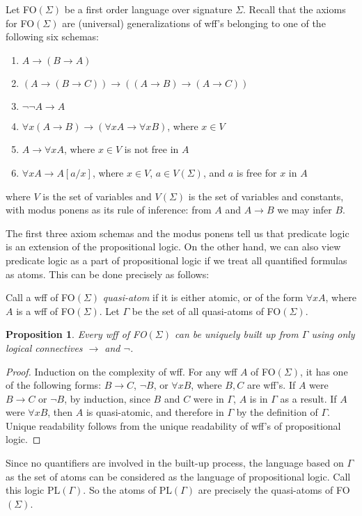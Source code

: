 \documentclass[12pt]{article}
\newtheorem{prop}{Proposition}
\begin{document}
Let FO$(\Sigma)$ be a first order language over signature $\Sigma$.  Recall that the axioms for FO$(\Sigma)$ are (universal) generalizations of wff's belonging to one of the following six schemas:
\begin{enumerate}
\item $A\to (B\to A)$
\item $(A\to (B\to C)) \to ((A\to B)\to (A\to C))$
\item $\neg \neg A \to A$
\item $\forall x (A\to B) \to (\forall x A \to \forall x B)$, where $x\in V$
\item $A\to \forall x A$, where $x\in V$ is not free in $A$
\item $\forall x A \to A[a/x]$, where $x\in V$, $a\in V(\Sigma)$, and $a$ is free for $x$ in $A$
\end{enumerate}
where $V$ is the set of variables and $V(\Sigma)$ is the set of variables and constants, with modus ponens as its rule of inference: from $A$ and $A\to B$ we may infer $B$.

The first three axiom schemas and the modus ponens tell us that predicate logic is an extension of the propositional logic.  On the other hand, we can also view predicate logic as a part of propositional logic if we treat all quantified formulas as atoms.  This can be done precisely as follows: 

Call a wff of FO$(\Sigma)$ \emph{quasi-atom} if it is either atomic, or of the form $\forall x A$, where $A$ is a wff of  FO$(\Sigma)$.  Let $\Gamma$ be the set of all quasi-atoms of FO$(\Sigma)$.

\begin{prop} Every wff of FO$(\Sigma)$ can be uniquely built up from $\Gamma$ using only logical connectives $\to$ and $\neg$. \end{prop}
\begin{proof}  Induction on the complexity of wff.  For any wff $A$ of FO$(\Sigma)$, it has one of the following forms: $B\to C$, $\neg B$, or $\forall x B$, where $B,C$ are wff's.  If $A$ were $B\to C$ or $\neg B$, by induction, since $B$ and $C$ were in $\Gamma$, $A$ is in $\Gamma$ as a result.  If $A$ were $\forall x B$, then $A$ is quasi-atomic, and therefore in $\Gamma$ by the definition of $\Gamma$.  Unique readability follows from the unique readability of wff's of propositional logic.
\end{proof}

Since no quantifiers are involved in the built-up process, the language based on $\Gamma$ as the set of atoms can be considered as the language of propositional logic.  Call this logic PL$(\Gamma)$.  So the atoms of PL$(\Gamma)$ are precisely the quasi-atoms of FO$(\Sigma)$.
\end{document}
